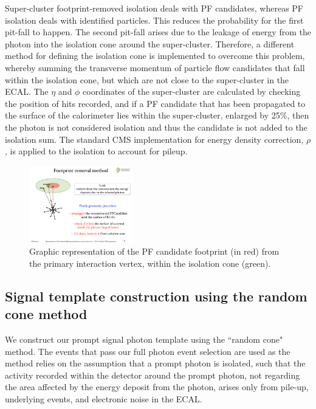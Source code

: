 Super-cluster footprint-removed isolation deals with PF candidates, whereas PF isolation deals with identified particles. This reduces the probability for the first pit-fall to happen. The second pit-fall arises due to the leakage of energy from the photon into the isolation cone around the super-cluster. Therefore, a different method for defining the isolation cone is implemented to overcome this problem, whereby summing the transverse momentum of particle flow candidates that fall within the isolation cone, but which are not close to the super-cluster in the ECAL. The $\eta$ and $\phi$ coordinates of the super-cluster are calculated by checking the position of hits recorded, and if a PF candidate that has been propagated to the surface of the calorimeter lies within the super-cluster, enlarged by 25\%, then the photon is not considered isolation and thus the candidate is not added to the isolation sum. The standard CMS implementation for energy density correction, $\rho$, is applied to the isolation to account for pileup. 

\begin{figure} \label{fig-SCFR}
\begin{center}
\includegraphics[width=0.4\textwidth]{Figures/RandomCone3.pdf}
\caption{Graphic representation of the PF candidate footprint (in red) from the primary interaction vertex, within the isolation cone (green). \cite{MarcoThesis}}
\end{center}
\end{figure}

\subsection{Signal template construction using the random cone method}

We construct our prompt signal photon template using the ``random cone" method. The events that pass our full photon event selection are used as the method relies on the assumption that a prompt photon is isolated, such that the activity recorded within the detector around the prompt photon, not regarding the area affected by the energy deposit from the photon, arises only from pile-up, underlying events, and electronic noise in the ECAL.  

